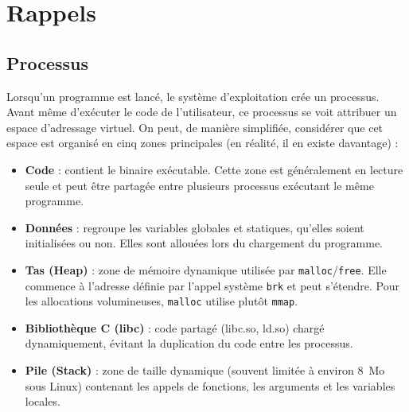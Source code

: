 \section{Rappels}

\subsection{Processus}

Lorsqu'un programme est lancé, le système d'exploitation crée un processus. Avant même d'exécuter le code de l'utilisateur, ce processus se voit attribuer un espace d'adressage virtuel.  
On peut, de manière simplifiée, considérer que cet espace est organisé en cinq zones principales (en réalité, il en existe davantage) :

\begin{itemize}
  \item \textbf{Code} : contient le binaire exécutable. Cette zone est généralement en lecture seule et peut être partagée entre plusieurs processus exécutant le même programme.
  
  \item \textbf{Données} : regroupe les variables globales et statiques, qu'elles soient initialisées ou non. Elles sont allouées lors du chargement du programme.
  
  \item \textbf{Tas (Heap)} : zone de mémoire dynamique utilisée par \texttt{malloc}/\texttt{free}. Elle commence à l'adresse définie par l'appel système \texttt{brk} et peut s'étendre. Pour les allocations volumineuses, \texttt{malloc} utilise plutôt \texttt{mmap}.
  
  \item \textbf{Bibliothèque C (libc)} : code partagé (libc.so, ld.so) chargé dynamiquement, évitant la duplication du code entre les processus.
  
  \item \textbf{Pile (Stack)} : zone de taille dynamique (souvent limitée à environ 8~Mo sous Linux) contenant les appels de fonctions, les arguments et les variables locales.
\end{itemize}

